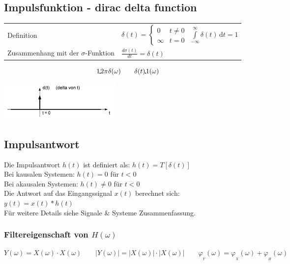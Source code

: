 \subsection{Impulsfunktion - dirac delta function}
	\begin{minipage}{10cm}
		\begin{tabular}{l l}
		Definition & $\delta (t)=\begin{cases} 0 & t\ne 0\\\infty & t=0\end{cases}$ \qquad $\int\limits_{-\infty}^\infty \delta(t) \, \mathrm dt = 1 $\\
		\parbox{3cm}{Zusammenhang mit der $\sigma$-Funktion} & $\frac{d\sigma(t)}{dt}=\delta(t)$ \\
		\end{tabular}
		\[
			1 \FT 2\pi \delta(\omega) \qquad \delta(t) \FT 1(\omega)
		\]
	\end{minipage}
	\begin{minipage}{8cm}
		\includegraphics[width=6cm]{./bilder/diracimpulse.png}
	\end{minipage}

	\subsection{Impulsantwort }
		Die Impulsantwort $h(t)$ ist definiert als: $h(t) = T[\delta(t)] $ \\
		\hspace*{0.5cm} Bei kausalen Systemen: $h(t) = 0$ für $t < 0$ \\   
		\hspace*{0.5cm} Bei akausalen Systemen: $h(t) \neq 0$ für $t < 0$\\ 
		Die Antwort auf das Eingangssignal $x(t)$ berechnet sich: $y(t) = x(t) * h(t)$ \\
		
		Für weitere Details siehe Signale \& Systeme Zusammenfassung.
		
		\subsubsection{Filtereigenschaft von $H(\omega)$}
			$ Y(\omega) = X(\omega) \cdot X(\omega)
				\qquad |Y(\omega)| = |X(\omega)| \cdot |X(\omega)|
				\qquad \varphi_{_Y}(\omega) = \varphi_{_X}(\omega) + \varphi_{_H}(\omega)$
		
